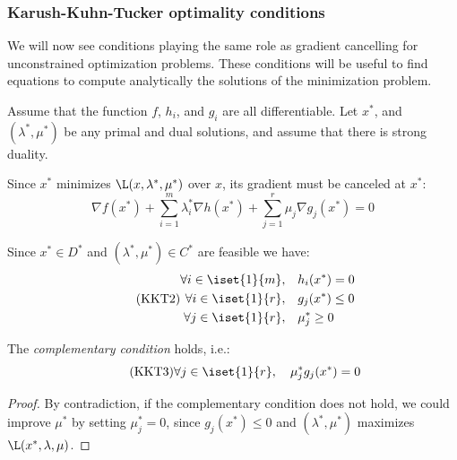 \documentclass[toc, titlepaged]{../cs-classes/cs-classes}
\begin{document}
\subsubsection{Karush-Kuhn-Tucker optimality conditions}
We will now see conditions playing the same role as gradient cancelling for unconstrained optimization problems. These conditions will be useful to find equations to compute analytically the solutions of the minimization problem.

Assume that the function $f$, $h_i$, and $g_i$ are all differentiable. Let $x^*$, and $(\lambda^*, \mu^*)$ be any primal and dual solutions, and assume that there is strong duality.

\begin{property}[KKT1]
    Since $x^*$ minimizes $\L(x, \lambda^*, \mu^*)$ over $x$, its gradient must be canceled at $x^*$:
    \begin{equation}
        \tag{KKT1}
        \nabla f(x^*) + \sum_{i=1}^m \lambda_i^*\nabla h(x^*) + \sum_{j=1}^r\mu_j\nabla g_j(x^*)=0
    \end{equation}
\end{property}

\begin{property}[KKT2]
    Since $x^*\in D^*$ and $(\lambda^*, \mu^*)\in C^*$ are feasible we have:
    \begin{equation}
        \tag{KKT2}
        \begin{aligned}
            \forall i\in\iset{1}{m},& \quad h_i(x^*)=0\\
            \forall i\in\iset{1}{r},& \quad g_j(x^*)\leq0\\
            \forall j\in\iset{1}{r},& \quad \mu_j^*\geq0
        \end{aligned}
    \end{equation}
\end{property}

\begin{property}[KKT3]
    The \emph{complementary condition} holds, i.e.:
    \begin{equation}
        \tag{KKT3}
        \forall j\in\iset{1}{r}, \quad \mu^*_jg_j(x^*)=0
    \end{equation}
\end{property}
\begin{proof}
    By contradiction, if the complementary condition does not hold, we could improve $\mu^*$ by setting $\mu_j^*=0$, since $g_j(x^*)\leq0$ and $(\lambda^*, \mu^*)$ maximizes $\L(x^*, \lambda, \mu)$.
\end{proof}
\end{document}
